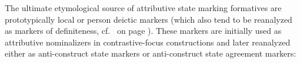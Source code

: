 The ultimate etymological source of attributive state marking formatives are prototypically local or person deictic markers (which also tend to be reanalyzed as markers of definiteness, cf.~ on page \pageref{ie-ural funcmap}). These markers are initially used as attributive nominalizers in contrastive-focus constructions and later reanalyzed either as anti-construct state markers or anti-construct state agreement markers:

